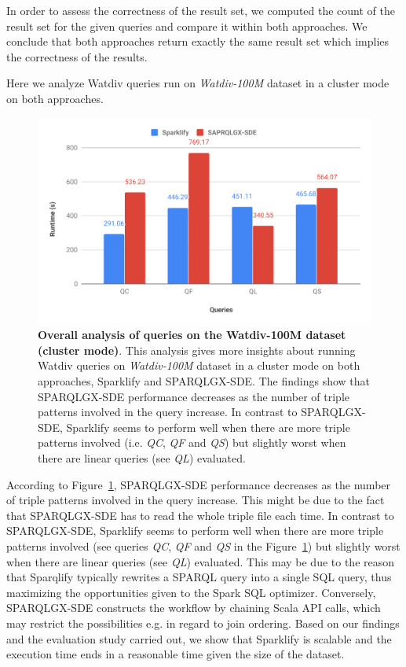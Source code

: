In order to assess the correctness of the result set, we computed the count of the result set for the given queries and compare it within both approaches.
We conclude that both approaches return exactly the same result set which implies the correctness of the results.

Here we analyze Watdiv queries run on \textit{Watdiv-100M} dataset in a cluster mode on both approaches.

\begin{figure}
  \includegraphics[width=1.0\columnwidth]{images/6_scalable_rdf_querying/sparklify-overall-analysis.pdf}
    \caption{\textbf{Overall analysis of queries on the Watdiv-100M dataset (cluster mode)}.
    This analysis gives more insights about running Watdiv queries on \textit{Watdiv-100M} dataset in a cluster mode on both approaches, Sparklify and SPARQLGX-SDE.
    The findings show that SPARQLGX-SDE performance decreases as the number of triple patterns involved in the query increase.
    In contrast to SPARQLGX-SDE, Sparklify seems to perform well when there are more triple patterns involved (i.e. \textit{QC}, \textit{QF} and \textit{QS}) but slightly worst when there are linear queries (see \textit{QL}) evaluated.}
    \label{fig:sparklify-overall-analysis}
\end{figure}

According to Figure~\ref{fig:sparklify-overall-analysis}, SPARQLGX-SDE performance decreases as the number of triple patterns involved in the query increase.
This might be due to the fact that SPARQLGX-SDE has to read the whole triple file each time.
In contrast to SPARQLGX-SDE, Sparklify seems to perform well when there are more triple patterns involved (see queries \textit{QC}, \textit{QF} and \textit{QS} in the Figure~\ref{fig:sparklify-overall-analysis}) but slightly worst when there are linear queries (see \textit{QL}) evaluated. 
This may be due to the reason that Sparqlify typically rewrites a \gls{SPARQL} query into a single SQL query, thus maximizing the opportunities given to the Spark SQL optimizer. Conversely, SPARQLGX-SDE constructs the workflow by chaining Scala API calls, which may restrict the possibilities e.g. in regard to join ordering.
Based on our findings and the evaluation study carried out, we show that Sparklify is scalable and the execution time ends in a reasonable time given the size of the dataset.

